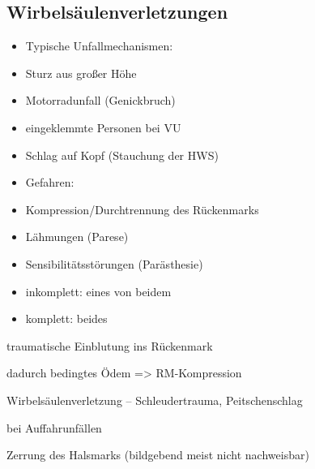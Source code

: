 \documentclass{article}
\begin{document}
\subsection{Wirbels\"aulenverletzungen}
\begin{itemize}
\item {\mdseries
Typische Unfallmechanismen:}

\end{itemize}
\begin{itemize}
\item {\mdseries
Sturz aus gro{\ss}er H\"ohe}

\item {\mdseries
Motorradunfall (Genickbruch)}

\item {\mdseries
eingeklemmte Personen bei VU}

\item {\mdseries
Schlag auf Kopf (Stauchung der HWS)}

\end{itemize}
\begin{itemize}
\item {\mdseries
Gefahren:}

\end{itemize}
\begin{itemize}
\item {\mdseries
Kompression/Durchtrennung des  R\"uckenmarks}

\item {\mdseries
L\"ahmungen (Parese)}

\item {\mdseries
Sensibilit\"atsst\"orungen (Par\"asthesie)}

\end{itemize}
\begin{itemize}
\item {\mdseries
inkomplett: eines von beidem}

\item {\mdseries
komplett: beides}

\end{itemize}
{\mdseries
traumatische Einblutung ins R\"uckenmark}

{\mdseries
dadurch bedingtes \"Odem ={\textgreater} RM-Kompression}

{\mdseries
Wirbels\"aulenverletzung -- Schleudertrauma, Peitschenschlag}

{\mdseries
bei Auffahrunf\"allen}

{\mdseries
Zerrung des Halsmarks (bildgebend meist nicht nachweisbar)}
\end{document}
